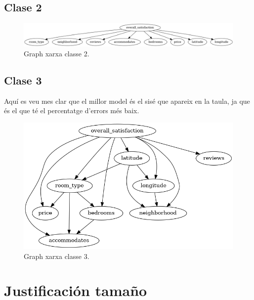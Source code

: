 \documentclass{article}
\begin{document}
\subsection{Clase 2}
\begin{figure}[H]
  \includegraphics[width=\linewidth]{classe2.png}
  \caption{Graph xarxa classe 2.}
  \label{fig:gp2}
\end{figure}
\subsection{Clase 3}
Aquí es veu mes clar que el millor model és el sisé que apareix en la taula, ja que és el que té el percentatge d'errors més baix.
\begin{figure}[H]
  \includegraphics[width=\linewidth]{classe3.png}
  \caption{Graph xarxa classe 3.}
  \label{fig:gp3}
\end{figure}

\section{Justificación tamaño}
\end{document}
